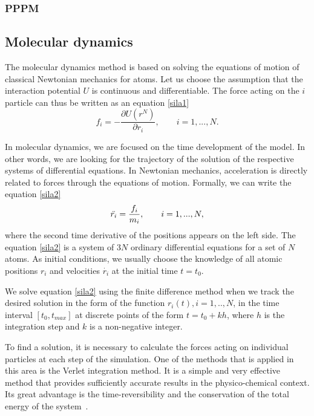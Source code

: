 \subsubsection{PPPM}


\subsection{Molecular dynamics}
The molecular dynamics method is based on solving the equations of motion of classical Newtonian mechanics for atoms. Let us choose the assumption that the interaction potential $U$ is continuous and differentiable. The force acting on the $i$ particle can thus be written as an equation \ref{sila1} 
\begin{equation}\label{sila1}
	f_i=-\frac{\partial U(r^N)}{\partial r_i}, \qquad i=1,...,N.
\end{equation}

In molecular dynamics, we are focused on the time development of the model. In other words, we are looking for the trajectory of the solution of the respective systems of differential equations. In Newtonian mechanics, acceleration is directly related to forces through the equations of motion. Formally, we can write the equation \ref{sila2}
\begin{equation}\label{sila2}
	\Ddot{r_i}=\frac{f_i}{m_i}, \qquad i=1,...,N,
\end{equation}
where the second time derivative of the positions appears on the left side. The equation \ref{sila2} is a system of 3$N$ ordinary differential equations for a set of $N$ atoms. As initial conditions, we usually choose the knowledge of all atomic positions $r_i$ and velocities $\dot{r_i}$ at the initial time $t=t_0$. 

We solve equation \ref{sila2} using the finite difference method when we track the desired solution in the form of the function $r_i(t), i=1,..,N$, in the time interval $[t_0,t_{max}]$ at discrete points of the form $t=t_0+kh$, where $h$ is the integration step and $k$ is a non-negative integer.

To find a solution, it is necessary to calculate the forces acting on individual particles at each step of the simulation. One of the methods that is applied in this area is the Verlet integration method. It is a simple and very effective method that provides sufficiently accurate results in the physico-chemical context. Its great advantage is the time-reversibility and the conservation of the total energy of the system~\cite{mdskripta}.

